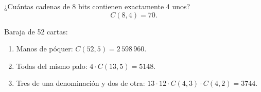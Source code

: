 \begin{ejemplo}
¿Cuántas cadenas de 8 bits contienen exactamente 4 unos?
\[
C(8,4) = 70.
\]
\end{ejemplo}

\begin{ejemplo}
Baraja de 52 cartas:
\begin{enumerate}[label=\alph*)]
  \item Manos de póquer: $C(52,5) = 2\,598\,960$.
  \item Todas del mismo palo: $4 \cdot C(13,5) = 5148$.
  \item Tres de una denominación y dos de otra: $13 \cdot 12 \cdot C(4,3) \cdot C(4,2) = 3744$.
\end{enumerate}
\end{ejemplo}